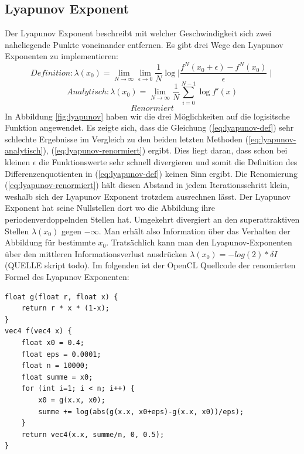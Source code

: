 \documentclass{scrartcl}
\begin{document}
\subsection{Lyapunov Exponent}
Der Lyapunov Exponent beschreibt mit welcher Geschwindigkeit sich zwei naheliegende Punkte voneinander entfernen. 
Es gibt drei Wege den Lyapunov Exponenten zu implementieren:
\begin{equation}
Definition: \lambda(x_0) = \lim_{N \rightarrow \infty}\lim_{\epsilon \rightarrow 0} \frac{1}{N}\log{\mid \frac{f^N(x_0+\epsilon)- f^N(x_0)}{\epsilon} \mid} 
\label{eq:lyapunov-def}
\end{equation}
\begin{equation}
Analytisch: \lambda(x_0) = \lim_{N \rightarrow \infty} \frac{1}{N} \sum_{i=0}^{N-1}  \log{f'(x)} 
\label{eq:lyapunov-analytisch}
\end{equation}
\begin{equation}
Renormiert
\label{eq:lyapunov-renormiert}
\end{equation}
In Abbildung \ref{fig:lyapunov} haben wir die drei Möglichkeiten auf die logisitsche Funktion angewendet.
Es zeigte sich, dass die Gleichung (\ref{eq:lyapunov-def}) sehr schlechte Ergebnisse im Vergleich zu den beiden letzten Methoden (\ref{eq:lyapunov-analytisch}), (\ref{eq:lyapunov-renormiert}) ergibt.
Dies liegt daran, dass schon bei kleinen $\epsilon$ die Funktionswerte sehr schnell divergieren und somit die Definition des Differenzenquotienten in (\ref{eq:lyapunov-def}) keinen Sinn ergibt.
Die Renomierung (\ref{eq:lyapunov-renormiert}) hält diesen Abstand in jedem Iterationsschritt klein, weshalb sich der Lyapunov Exponent trotzdem ausrechnen lässt.
Der Lyapunov Exponent hat seine Nullstellen dort wo die Abbildung ihre periodenverdoppelnden Stellen hat. Umgekehrt divergiert an den superattraktiven Stellen $\lambda(x_0)$ gegen $-\infty$.
Man erhält also Information über das Verhalten der Abbildung für bestimmte $x_0$.
Tratsächlich kann man den Lyapunov-Exponenten über den mittleren Informationsverlust ausdrücken $\lambda(x_0)=-log(2)*\delta I$ (QUELLE skript todo).
Im folgenden ist der OpenCL Quellcode der renomierten Formel des Lyapunov Exponenten:
\begin{lstlisting}
float g(float r, float x) {
    return r * x * (1-x);
}
vec4 f(vec4 x) {
    float x0 = 0.4;
    float eps = 0.0001;
    float n = 10000;
    float summe = x0;
    for (int i=1; i < n; i++) {
        x0 = g(x.x, x0);
        summe += log(abs(g(x.x, x0+eps)-g(x.x, x0))/eps);
    }
    return vec4(x.x, summe/n, 0, 0.5);
}
\end{lstlisting}
\end{document}
